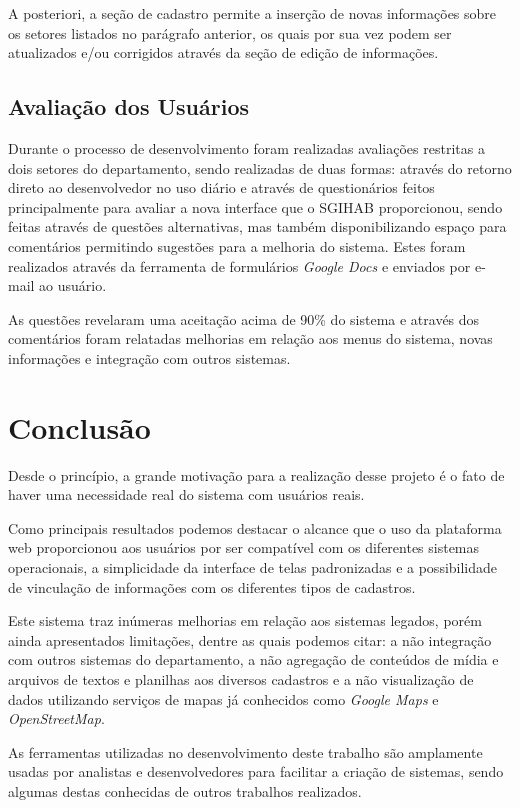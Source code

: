 \documentclass[10pt, twocolumn]{article}
\begin{document}
A posteriori, a seção de cadastro permite a inserção de novas informações sobre os setores listados no parágrafo anterior, os quais por sua vez podem ser atualizados e/ou corrigidos através da seção de edição de informações.

\subsection{Avaliação dos Usuários}
\label{rect:aval}
Durante o processo de desenvolvimento foram realizadas avaliações restritas a dois setores do departamento, sendo realizadas de duas formas: através do retorno direto ao desenvolvedor no uso diário e através de questionários feitos principalmente para avaliar a nova interface que o SGIHAB proporcionou, sendo feitas através de questões alternativas, mas também disponibilizando espaço para comentários permitindo sugestões para a melhoria do sistema. Estes foram realizados através da ferramenta de formulários \textit{Google Docs} e enviados por e-mail ao usuário.

As questões revelaram uma aceitação acima de 90\% do sistema e através dos comentários foram relatadas melhorias em relação aos menus do sistema, novas informações e integração com outros sistemas.

\section{Conclusão}
\label{sect:conclusion}
Desde o princípio, a grande motivação para a realização desse projeto é o fato de haver uma necessidade real do sistema com usuários reais.

Como principais resultados podemos destacar o alcance que o uso da plataforma web proporcionou aos usuários por ser compatível com os diferentes sistemas operacionais, a simplicidade da interface de telas padronizadas e a possibilidade de vinculação de informações com os diferentes tipos de cadastros.

Este sistema traz inúmeras melhorias em relação aos sistemas legados, porém ainda apresentados limitações, dentre as quais podemos citar: a não integração com outros sistemas do departamento, a não agregação de conteúdos de mídia e arquivos de textos e planilhas aos diversos cadastros e a não visualização de dados utilizando serviços de mapas já conhecidos como \textit{Google Maps} e \textit{OpenStreetMap}.

As ferramentas utilizadas no desenvolvimento deste trabalho são amplamente usadas por analistas e desenvolvedores para facilitar a criação de sistemas, sendo algumas destas conhecidas de outros trabalhos realizados.
\end{document}
